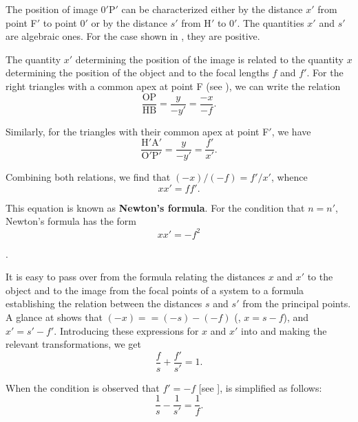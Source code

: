 The position of image $0'$P$'$ can be characterized either by the distance $x'$ from point F$'$ to point $0'$ or by the distance $s'$ from H$'$ to $0'$.
The quantities $x'$ and $s'$ are algebraic ones.
For the case shown in , they are positive.

The quantity $x'$ determining the position of the image is related to the quantity $x$ determining the position of the object and to the focal lengths $f$ and $f'$.
For the right triangles with a common apex at point F (see ), we can write the relation
\begin{equation}\label{eq:16_60}
    \frac{\text{OP}}{\text{HB}} = \frac{y}{-y'} = \frac{-x}{-f}.
\end{equation}

\noindent
Similarly, for the triangles with their common apex at point F$'$, we have
\begin{equation}\label{eq:16_61}
    \frac{\text{H$'$A$'$}}{\text{O$'$P$'$}} = \frac{y}{-y'} = \frac{f'}{x'}.
\end{equation}

\noindent
Combining both relations, we find that $(-x)/(-f)=f'/x'$, whence
\begin{equation}\label{eq:16_62}
    xx' = ff'.
\end{equation}

\noindent
This equation is known as \textbf{Newton's formula}.
For the condition that $n = n'$, Newton's formula has the form
\begin{equation}\label{eq:16_63}
    xx' = -f^2
\end{equation}

.

It is easy to pass over from the formula relating the distances $x$ and $x'$ to the object and to the image from the focal points of a system to a formula establishing the relation between the distances $s$ and $s'$ from the principal points.
A glance at  shows that $(-x) =
= (-s) - (-f)$ (\ie, $x=s-f$), and $x'=s'-f'$.
Introducing these expressions for $x$ and $x'$ into  and making the relevant transformations, we get
\begin{equation}\label{eq:16_64}
    \frac{f}{s} + \frac{f'}{s'} = 1.
\end{equation}

\noindent
When the condition is observed that $f'=-f$ [see ],  is simplified as follows:
\begin{equation}\label{eq:16_65}
    \frac{1}{s} - \frac{1}{s'} = \frac{1}{f}.
\end{equation}

